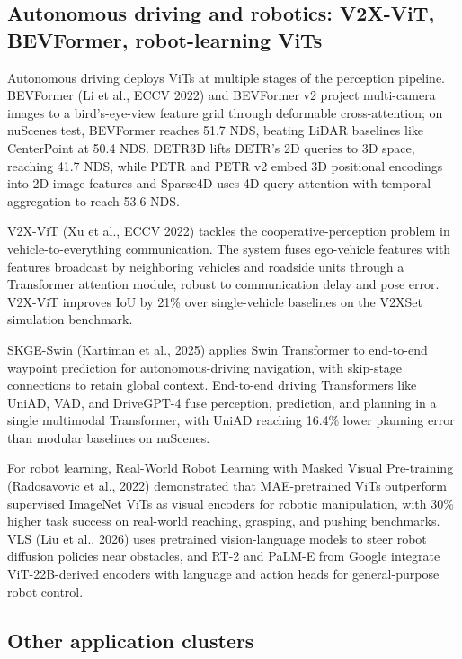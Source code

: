 \subsection{Autonomous driving and robotics: V2X-ViT, BEVFormer, robot-learning ViTs}\label{autonomous-driving-and-robotics-v2x-vit-bevformer-robot-learning-vits}

Autonomous driving deploys ViTs at multiple stages of the perception pipeline. BEVFormer (Li et al., ECCV 2022) and BEVFormer v2 project multi-camera images to a bird's-eye-view feature grid through deformable cross-attention; on nuScenes test, BEVFormer reaches 51.7 NDS, beating LiDAR baselines like CenterPoint at 50.4 NDS. DETR3D lifts DETR's 2D queries to 3D space, reaching 41.7 NDS, while PETR and PETR v2 embed 3D positional encodings into 2D image features and Sparse4D uses 4D query attention with temporal aggregation to reach 53.6 NDS.

V2X-ViT (Xu et al., ECCV 2022) tackles the cooperative-perception problem in vehicle-to-everything communication. The system fuses ego-vehicle features with features broadcast by neighboring vehicles and roadside units through a Transformer attention module, robust to communication delay and pose error. V2X-ViT improves IoU by 21\% over single-vehicle baselines on the V2XSet simulation benchmark.

SKGE-Swin (Kartiman et al., 2025) applies Swin Transformer to end-to-end waypoint prediction for autonomous-driving navigation, with skip-stage connections to retain global context. End-to-end driving Transformers like UniAD, VAD, and DriveGPT-4 fuse perception, prediction, and planning in a single multimodal Transformer, with UniAD reaching 16.4\% lower planning error than modular baselines on nuScenes.

For robot learning, Real-World Robot Learning with Masked Visual Pre-training (Radosavovic et al., 2022) demonstrated that MAE-pretrained ViTs outperform supervised ImageNet ViTs as visual encoders for robotic manipulation, with 30\% higher task success on real-world reaching, grasping, and pushing benchmarks. VLS (Liu et al., 2026) uses pretrained vision-language models to steer robot diffusion policies near obstacles, and RT-2 and PaLM-E from Google integrate ViT-22B-derived encoders with language and action heads for general-purpose robot control.

\subsection{Other application clusters}\label{other-application-clusters}

